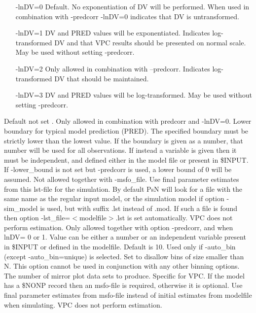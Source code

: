 \begin{optionlist}
\begin{itemize}
	\item[-lnDV=0]  Default. No exponentiation of DV will be performed. When used in combination with -predcorr -lnDV=0 indicates that DV is untransformed.
	\item[-lnDV=1]  DV and PRED values will be exponentiated. Indicates log-transformed DV and that VPC results should be presented on normal scale. May be used without setting -predcorr.
	\item[-lnDV=2]  Only allowed in combination with –predcorr. Indicates log-transformed DV that should be maintained.
	\item[-lnDV=3]  DV and PRED values will be log-transformed. May be used without setting \mbox{-predcorr}.
\end{itemize}
\nextopt
{}
Default not set . Only allowed in combination with predcorr and -lnDV=0. Lower boundary for typical model prediction (PRED). The specified boundary must be strictly lower than the lowest value. If the boundary is given as a number, that number will be used for all observations. If  instead a variable is given then it must be independent, and defined either in the model file or present in \$INPUT.  If -lower\_bound is not set but -predcorr is used, a lower bound of 0 will be assumed. 
\nextopt
{}
Not allowed together with -msfo\_file. Use final parameter estimates from this lst-file for the simulation. By default PsN will look for a file with the same name as the regular input model, or the simulation model if option -sim\_model is used, but with suffix .lst instead of .mod. If such a file is found then option -lst\_file=$<$modelfile$>$.lst is set automatically. VPC does not perform estimation. 
\nextopt
{}
Only allowed together with option -predcorr, and when lnDV= 0 or 1. Value can be either a number or an independent variable present in \$INPUT or defined in the modelfile.
\nextopt
{}
Default is 10. Used only if -auto\_bin (except -auto\_bin=unique) is selected. Set to disallow bins of size smaller than N. 
This option cannot be used in conjunction with any other binning options.
\nextopt
{}
The number of mirror plot data sets to produce. Specific for VPC. 
\nextopt
{}
If the model has a \$NONP record then an msfo-file is required, otherwise it is optional. Use final parameter estimates from msfo-file instead of initial estimates from modelfile when simulating. VPC does not perform estimation. 

\end{optionlist}
